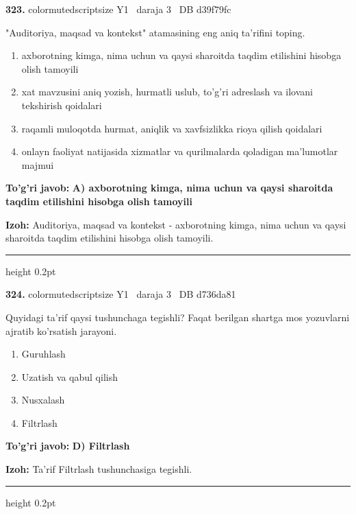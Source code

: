 \documentclass[10pt,a4paper,oneside]{article}
\begin{document}
\noindent\textbf{\color{ink}323.}  {color{muted}scriptsize Y1 \textbullet\ daraja 3 \textbullet\ DB d39f79fc}
\par
"Auditoriya, maqsad va kontekst" atamasining eng aniq ta'rifini toping.
\begin{enumerate}[label=\Alph*),leftmargin=9mm]
\item axborotning kimga, nima uchun va qaysi sharoitda taqdim etilishini hisobga olish tamoyili
\item xat mavzusini aniq yozish, hurmatli uslub, to'g'ri adreslash va ilovani tekshirish qoidalari
\item raqamli muloqotda hurmat, aniqlik va xavfsizlikka rioya qilish qoidalari
\item onlayn faoliyat natijasida xizmatlar va qurilmalarda qoladigan ma'lumotlar majmui
\end{enumerate}
\begin{tcolorbox}[enhanced,breakable,colback=teal!4,colframe=teal!50!black,boxrule=0.5pt,arc=1.1mm,left=3mm,right=3mm,top=1.7mm,bottom=1.7mm,before skip=2mm,after skip=2mm]
\textbf{\color{teal}To'g'ri javob:} \textbf{A) axborotning kimga, nima uchun va qaysi sharoitda taqdim etilishini hisobga olish tamoyili}
\par\smallskip
\textbf{Izoh:} Auditoriya, maqsad va kontekst - axborotning kimga, nima uchun va qaysi sharoitda taqdim etilishini hisobga olish tamoyili.
\end{tcolorbox}
\vspace{2mm}\hrule height 0.2pt \vspace{3mm}

\noindent\textbf{\color{ink}324.}  {color{muted}scriptsize Y1 \textbullet\ daraja 3 \textbullet\ DB d736da81}
\par
Quyidagi ta'rif qaysi tushunchaga tegishli? Faqat berilgan shartga mos yozuvlarni ajratib ko'rsatish jarayoni.
\begin{enumerate}[label=\Alph*),leftmargin=9mm]
\item Guruhlash
\item Uzatish va qabul qilish
\item Nusxalash
\item Filtrlash
\end{enumerate}
\begin{tcolorbox}[enhanced,breakable,colback=teal!4,colframe=teal!50!black,boxrule=0.5pt,arc=1.1mm,left=3mm,right=3mm,top=1.7mm,bottom=1.7mm,before skip=2mm,after skip=2mm]
\textbf{\color{teal}To'g'ri javob:} \textbf{D) Filtrlash}
\par\smallskip
\textbf{Izoh:} Ta'rif Filtrlash tushunchasiga tegishli.
\end{tcolorbox}
\vspace{2mm}\hrule height 0.2pt \vspace{3mm}
\end{document}

